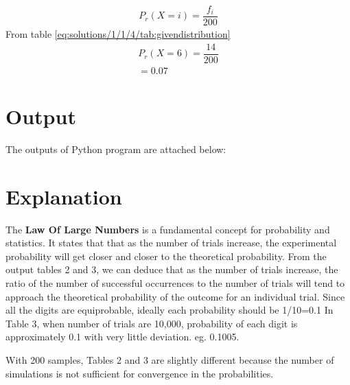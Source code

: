 \begin{align}
    P_r (X=i)= \dfrac{{f}_{i}}{200}
\end{align}
From table \ref{eq:solutions/1/1/4/tab:givendistribution}
\begin{align}
    P_r (X=6)= \dfrac{14}{200}\\
    =0.07
\end{align}
\section{Output}
The outputs of Python program are attached below:


\section{Explanation}
The \textbf{Law Of Large Numbers} is a fundamental concept for probability and statistics. It states that  that as the number of trials increase, the experimental probability will get closer and closer to the theoretical probability.
 From the output tables 2 and 3, we can deduce that as the number of trials increase,  the ratio of the number of successful occurrences to the number of trials will tend to approach the theoretical probability of the outcome for an individual trial. 
Since all the digits are equiprobable, ideally each probability should be 1/10=0.1
 In Table 3, when number of trials are 10,000, probability of each digit is approximately 0.1 with very little deviation. eg. 0.1005.  

With 200 samples, Tables 2 and 3 are slightly different because the number of simulations is not sufficient for convergence in the probabilities.
